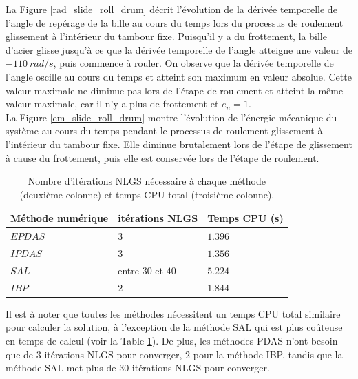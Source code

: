 La Figure \ref{rad_slide_roll_drum} décrit l'évolution de la dérivée temporelle de l'angle de repérage de la bille au cours du temps lors du processus de roulement glissement à l'intérieur du tambour fixe. Puisqu'il y a du frottement, la bille d'acier glisse jusqu'à ce que la dérivée temporelle de l'angle atteigne une valeur de $ -110\ rad / s $, puis commence à rouler. On observe que la dérivée temporelle de l'angle oscille au cours du temps et atteint son maximum en valeur absolue. Cette valeur maximale ne diminue pas lors de l'étape de roulement et atteint la même valeur maximale, car il n'y a plus de frottement et $e_n = 1$.\\
La Figure \ref{em_slide_roll_drum} montre l'évolution de l'énergie mécanique du système au cours du temps pendant le processus de roulement glissement à l'intérieur du tambour fixe. Elle diminue brutalement lors de l'étape de glissement à cause du frottement, puis elle est conservée lors de l'étape de roulement.

\begin{center}
\begin{table}[!h]
\begin{tabular}{ |p{4cm}|p{4cm}|p{4cm}| }

 \hline \rowcolor{lightgray}
 Méthode numérique& itérations NLGS& Temps CPU (s)\\
 \hline
 $EPDAS$ & $3$& $1.396$\\
 $IPDAS$ & $3$& $1.356$\\
 $SAL$ & entre $30$ et $40$& $5.224$\\
 $IBP$ & $2$& $1.844$\\
 \hline
\end{tabular}
\caption{Nombre d'itérations NLGS nécessaire à chaque méthode (deuxième colonne) et temps CPU total (troisième colonne).}\label{tab16}
\end{table}
\end{center}

Il est à noter que toutes les méthodes nécessitent un temps CPU total similaire pour calculer la solution, à l'exception de la méthode SAL qui est plus coûteuse en temps de calcul (voir la Table \ref{tab16}). De plus, les méthodes PDAS n'ont besoin que de $ 3 $ itérations  NLGS pour converger, $ 2 $ pour la méthode IBP, tandis que la méthode SAL met plus de 30 itérations NLGS pour converger.


